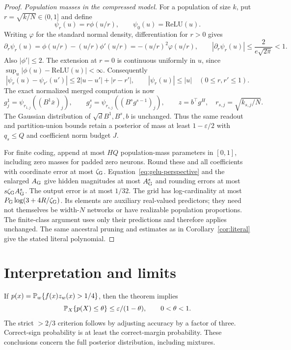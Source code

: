 \documentclass[11pt]{article}
\newcommand{\relu}{\mathrm{ReLU}}
\begin{document}
\begin{proof}
\emph{Population masses in the compressed model.}
For a population of size $k$, put $r=\sqrt{k/N}\in(0,1]$ and define
\[
 \psi_r(u)=r\phi(u/r),\qquad \psi_0(u)=\relu(u).
\]
Writing $\varphi$ for the standard normal density, differentiation for
$r>0$ gives
\[
 \partial_r\psi_r(u)=\phi(u/r)-(u/r)\phi'(u/r)
 =-(u/r)^2\varphi(u/r),
 \qquad |\partial_r\psi_r(u)|\le\frac{2}{e\sqrt{2\pi}}<1.
\]
Also $|\phi'|\le2$. The extension at $r=0$ is continuous uniformly
in $u$, since $\sup_u|\phi(u)-\relu(u)|<\infty$. Consequently
\begin{equation}\label{eq:gelu-perspective}
 |\psi_r(u)-\psi_{r'}(u')|\le2|u-u'|+|r-r'|,
 \qquad |\psi_r(u)|\le|u|
 \quad(0\le r,r'\le1).
\end{equation}
The exact normalized merged computation is now
\[
 g^1_j=\psi_{r_{1,j}}((B^1\bar x)_j),\qquad
 g^s_j=\psi_{r_{s,j}}((B^sg^{s-1})_j),\qquad z=b^\top g^H,
 \quad r_{s,j}=\sqrt{k_{s,j}/N}.
\]
The Gaussian distribution of $\sqrt dB^1,B^s,b$ is unchanged.
Thus the same readout and partition-union bounds retain a posterior
of mass at least $1-\varepsilon/2$ with $q_s\le Q$ and coefficient
norm budget $J$.

For finite coding, append at most $HQ$ population-mass parameters in
$[0,1]$, including zero masses for padded zero neurons. Round these
and all coefficients with coordinate error at most $\zeta_{\rm G}$.
Equation~\eqref{eq:gelu-perspective} and the enlarged $A_{\rm G}$ give
hidden magnitudes at most $A_{\rm G}^s$ and rounding errors at most
$s\zeta_{\rm G}A_{\rm G}^s$. The output error is at most $1/32$.
The grid has log-cardinality at most
$P_{\rm G}\log(3+4R/\zeta_{\rm G})$. Its elements are auxiliary
real-valued predictors; they need not themselves be width-$N$
networks or have realizable population proportions. The finite-class
argument uses only their predictions and therefore applies unchanged.
The same ancestral pruning and estimates as in
Corollary~\ref{cor:literal} give the stated literal polynomial.
\end{proof}

\section{Interpretation and limits}
If $p(x)=\mathbb P_w\{f(x)z_w(x)>1/4\}$, then the theorem implies
\[
 \mathbb P_X\{p(X)\le\theta\}\le\varepsilon/(1-\theta),\qquad0<\theta<1.
\]
The strict $>2/3$ criterion follows by adjusting accuracy by a factor of three. Correct-sign probability is at least the correct-margin probability. These conclusions concern the full posterior distribution, including mixtures.
\end{document}
